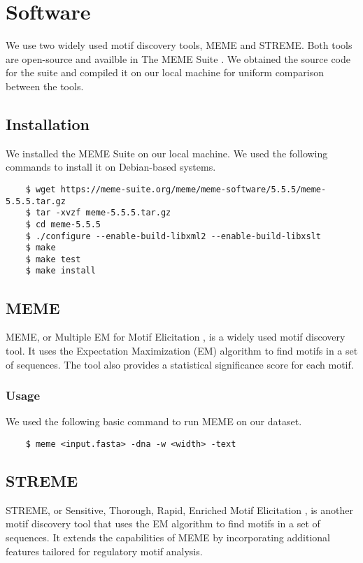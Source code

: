 \section{Software}

We use two widely used motif discovery tools, MEME and STREME. Both tools are open-source and availble in The MEME Suite \cite{memesuite}. We obtained the source code for the suite and compiled it on our local machine for uniform comparison between the tools.

\subsection{Installation}

We installed the MEME Suite on our local machine. We used the following commands to install it on Debian-based systems.

\begin{verbatim}
	$ wget https://meme-suite.org/meme/meme-software/5.5.5/meme-5.5.5.tar.gz
	$ tar -xvzf meme-5.5.5.tar.gz
	$ cd meme-5.5.5
	$ ./configure --enable-build-libxml2 --enable-build-libxslt
	$ make
	$ make test
	$ make install
\end{verbatim}


\subsection{MEME}

MEME, or Multiple EM for Motif Elicitation \cite{Bailey1994}, is a widely used motif discovery tool. It uses the Expectation Maximization (EM) algorithm to find motifs in a set of sequences. The tool also provides a statistical significance score for each motif.

\subsubsection*{Usage}

We used the following basic command to run MEME on our dataset.

\begin{verbatim}
	$ meme <input.fasta> -dna -w <width> -text
\end{verbatim}


\subsection{STREME}

STREME, or Sensitive, Thorough, Rapid, Enriched Motif Elicitation \cite{btab203}, is another motif discovery tool that uses the EM algorithm to find motifs in a set of sequences. It extends the capabilities of MEME by incorporating additional features tailored for regulatory motif analysis.

